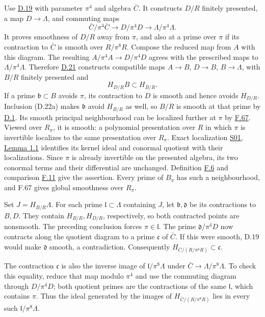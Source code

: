 \documentclass[11pt,a4paper,openany]{report}
\begin{document}
Use \hyperref[AG-RG-S05-smoothing-lemma-lifting]{D.19} with parameter \(\pi^4\) and algebra \(\bar C\). It constructs \(D/R\) finitely presented, a map \(D\to\Lambda\), and commuting maps \[
\bar C/\pi^4\bar C\longrightarrow D/\pi^4D
\longrightarrow\Lambda/\pi^4\Lambda.
\] It proves smoothness of \(D/R\) away from \(\pi\), and also at a prime over \(\pi\) if its contraction to \(\bar C\) is smooth over \(R/\pi^8R\). Compose the reduced map from \(A\) with this diagram. The resulting \(A/\pi^4A\to D/\pi^4D\) agrees with the prescribed maps to \(\Lambda/\pi^4\Lambda\). Therefore \hyperref[AG-RG-S05-smoothing-lemma-desingularize-strictly-standard]{D.21} constructs compatible maps \(A\to B\), \(D\to B\), \(B\to\Lambda\), with \(B/R\) finitely presented and \[
H_{D/R}B\subset H_{B/R}.
\tag{D.22a}
\] If a prime \(\mathfrak b\subset B\) avoids \(\pi\), its contraction to \(D\) is smooth and hence avoids \(H_{D/R}\). Inclusion (D.22a) makes \(\mathfrak b\) avoid \(H_{B/R}\) as well, so \(B/R\) is smooth at that prime by \hyperref[AG-RG-S05-smoothing-definition-singular-ideal]{D.1}. Its smooth principal neighbourhood can be localized further at \(\pi\) by \hyperref[AG-RG-S05-algebra-lemma-locally-smooth]{F.67}. Viewed over \(R_\pi\), it is smooth: a polynomial presentation over \(R\) in which \(\pi\) is invertible localizes to the same presentation over \(R_\pi\). Exact localization \href{https://github.com/KokunoYumeto/open-math-courses/blob/main/docs/courses/AG-RG/AG-RG-S01.md}{S01, Lemma 1.1} identifies its kernel ideal and conormal quotient with their localizations. Since \(\pi\) is already invertible on the presented algebra, its two conormal terms and their differential are unchanged. Definition \hyperref[AG-RG-S05-algebra-definition-smooth]{F.6} and comparison \hyperref[AG-RG-S05-algebra-lemma-NL-homotopy]{F.11} give the assertion. Every prime of \(B_\pi\) has such a neighbourhood, and F.67 gives global smoothness over \(R_\pi\).

Set \(J=H_{B/R}\Lambda\). For each prime \(\mathfrak l\subset\Lambda\) containing \(J\), let \(\mathfrak b,\mathfrak d\) be its contractions to \(B,D\). They contain \(H_{B/R},H_{D/R}\), respectively, so both contracted points are nonsmooth. The preceding conclusion forces \(\pi\in\mathfrak l\). The prime \(\mathfrak d/\pi^4D\) now contracts along the quotient diagram to a prime \(\mathfrak c\) of \(\bar C\). If this were smooth, D.19 would make \(\mathfrak d\) smooth, a contradiction. Consequently \(H_{\bar C/(R/\pi^8R)}\subset\mathfrak c\).

The contraction \(\mathfrak c\) is also the inverse image of \(\mathfrak l/\pi^8\Lambda\) under \(\bar C\to\Lambda/\pi^8\Lambda\). To check this equality, reduce that map modulo \(\pi^4\) and use the commuting diagram through \(D/\pi^4D\); both quotient primes are the contractions of the same \(\mathfrak l\), which contains \(\pi\). Thus the ideal generated by the images of \(H_{\bar C/(R/\pi^8R)}\) lies in every such \(\mathfrak l/\pi^8\Lambda\).
\end{document}
